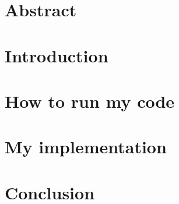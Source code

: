 \documentclass{report}
\begin{document}


\chapter*{Abstract}


\tableofcontents

\chapter*{Introduction}


\chapter{How to run my code}


\chapter{My implementation}


\chapter*{Conclusion}


\listofalgorithms
{}

\listoffigures
\end{document}
